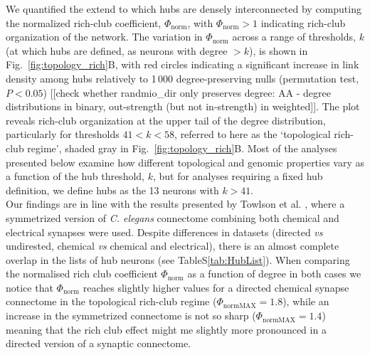 \documentclass[10pt,letterpaper]{article}
\begin{document}
We quantified the extend to which hubs are densely interconnected by computing the normalized rich-club coefficient, $\Phi_\mathrm{norm}$, with $\Phi_\mathrm{norm} > 1$ indicating rich-club organization of the network.
The variation in $\Phi_\mathrm{norm}$ across a range of thresholds, $k$ (at which hubs are defined, as neurons with degree $>k$), is shown in Fig.~\ref{fig:topology_rich}B, with red circles indicating a significant increase in link density among hubs relatively to 1\,000 degree-preserving nulls (permutation test, $P < 0.05$) [[check whether randmio\_dir only preserves degree: AA - degree distributions in binary, out-strength (but not in-strength) in weighted]].
The plot reveals rich-club organization at the upper tail of the degree distribution, particularly for thresholds $41 < k < 58$, referred to here as the `topological rich-club regime', shaded gray in Fig.~\ref{fig:topology_rich}B.
Most of the analyses presented below examine how different topological and genomic properties vary as a function of the hub threshold, $k$, but for analyses requiring a fixed hub definition, we define hubs as the 13 neurons with $k > 41$.\\
Our findings are in line with the results presented by Towlson et al. \cite{Towlson2013}, where a symmetrized version of \textit{C. elegans} connectome combining both chemical and electrical synapses were used. 
Despite differences in datasets (directed \textit{vs} undirested, chemical \textit{vs} chemical and electrical), there is an almost complete overlap in the lists of hub neurons (see TableS\ref{tab:HubList}). 
When comparing the normalised rich club coefficient $\Phi_\mathrm{norm}$ as a function of degree in both cases we notice that $\Phi_\mathrm{norm}$ reaches slightly higher values for a directed chemical synapse connectome in the topological rich-club regime ($\Phi_\mathrm{normMAX} = 1.8$), while an increase in the symmetrized connectome is not so sharp ($\Phi_\mathrm{normMAX} = 1.4$) meaning that the  rich club effect might me slightly more pronounced in a directed version of a synaptic connectome. 
\end{document}
